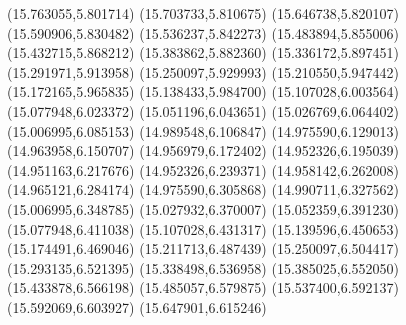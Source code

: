 {{\lineto(15.763055,5.801714)
\lineto(15.703733,5.810675)
\lineto(15.646738,5.820107)
\lineto(15.590906,5.830482)
\lineto(15.536237,5.842273)
\lineto(15.483894,5.855006)
\lineto(15.432715,5.868212)
\lineto(15.383862,5.882360)
\lineto(15.336172,5.897451)
\lineto(15.291971,5.913958)
\lineto(15.250097,5.929993)
\lineto(15.210550,5.947442)
\lineto(15.172165,5.965835)
\lineto(15.138433,5.984700)
\lineto(15.107028,6.003564)
\lineto(15.077948,6.023372)
\lineto(15.051196,6.043651)
\lineto(15.026769,6.064402)
\lineto(15.006995,6.085153)
\lineto(14.989548,6.106847)
\lineto(14.975590,6.129013)
\lineto(14.963958,6.150707)
\lineto(14.956979,6.172402)
\lineto(14.952326,6.195039)
\lineto(14.951163,6.217676)
\lineto(14.952326,6.239371)
\lineto(14.958142,6.262008)
\lineto(14.965121,6.284174)
\lineto(14.975590,6.305868)
\lineto(14.990711,6.327562)
\lineto(15.006995,6.348785)
\lineto(15.027932,6.370007)
\lineto(15.052359,6.391230)
\lineto(15.077948,6.411038)
\lineto(15.107028,6.431317)
\lineto(15.139596,6.450653)
\lineto(15.174491,6.469046)
\lineto(15.211713,6.487439)
\lineto(15.250097,6.504417)
\lineto(15.293135,6.521395)
\lineto(15.338498,6.536958)
\lineto(15.385025,6.552050)
\lineto(15.433878,6.566198)
\lineto(15.485057,6.579875)
\lineto(15.537400,6.592137)
\lineto(15.592069,6.603927)
\lineto(15.647901,6.615246)
\stroke}
%
}
